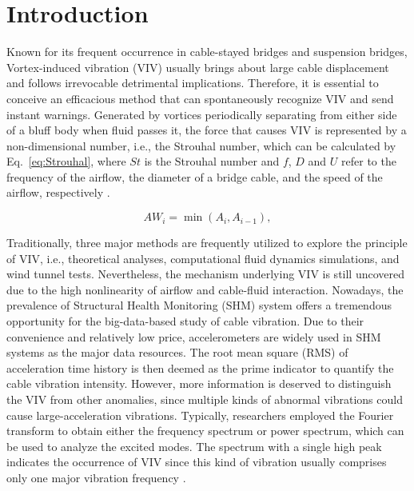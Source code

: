 \documentclass[preprint, 3p, times, compress, 11pt]{elsarticle}
\begin{document}
\section{Introduction}

Known for its frequent occurrence in cable-stayed bridges and suspension 
bridges, Vortex-induced vibration (VIV) usually brings about large cable 
displacement and follows irrevocable detrimental implications. Therefore, 
it is essential to conceive an efficacious method that can spontaneously 
recognize VIV and send instant warnings. Generated by vortices 
periodically separating from either side of a bluff body when fluid 
passes it, the force that causes VIV is represented by a non-dimensional 
number, i.e., the Strouhal number, which can be calculated by 
Eq.~\eqref{eq:Strouhal}, where $St$ is the Strouhal number and $f$, $D$ 
and $U$ refer to the frequency of the airflow, the diameter of a bridge 
cable, and the speed of the airflow, respectively \cite{jafari2020windinduced}. 

\begin{equation}
    AW_i = \min \left(A_i, A_{i-1}\right),
    \label{eq:Strouhal}
\end{equation}

Traditionally, three major methods are frequently utilized to explore 
the principle of VIV, i.e., theoretical analyses, computational fluid 
dynamics simulations, and wind tunnel tests. Nevertheless, the mechanism 
underlying VIV is still uncovered due to the high nonlinearity of 
airflow and cable-fluid interaction. Nowadays, the prevalence of 
Structural Health Monitoring (SHM) system offers a tremendous 
opportunity for the big-data-based study of cable vibration. Due to 
their convenience and relatively low price, accelerometers are widely 
used in SHM systems as the major data resources. The root mean square (RMS) 
of acceleration time history is then deemed as the prime indicator to 
quantify the cable vibration intensity. However, more information is 
deserved to distinguish the VIV from other anomalies, since multiple 
kinds of abnormal vibrations could cause large-acceleration vibrations. 
Typically, researchers employed the Fourier transform to obtain either 
the frequency spectrum or power spectrum, which can be used to analyze 
the excited modes. The spectrum with a single high peak indicates the 
occurrence of VIV since this kind of vibration usually comprises only 
one major vibration frequency \cite{li2018datadriven}. 
\end{document}
